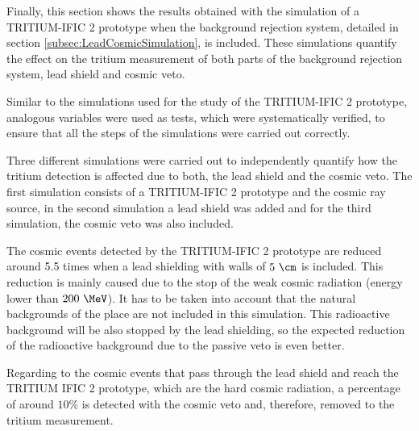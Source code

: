 Finally, this section shows the results obtained with the simulation of a TRITIUM-IFIC 2 prototype when the background rejection system, detailed in section \ref{subsec:LeadCosmicSimulation}, is included. These simulations quantify the effect on the tritium measurement of both parts of the background rejection system, lead shield and cosmic veto.

Similar to the simulations used for the study of the TRITIUM-IFIC 2 prototype, analogous variables were used as tests, which were systematically verified, to ensure that all the steps of the simulations were carried out correctly.

Three different simulations were carried out to independently quantify how the tritium detection is affected due to both, the lead shield and the cosmic veto. The first simulation consists of a TRITIUM-IFIC 2 prototype and the cosmic ray source, in the second simulation a lead shield was added and for the third simulation, the cosmic veto was also included.

The cosmic events detected by the TRITIUM-IFIC 2 prototype are reduced around 5.5 times when a lead shielding with walls of $5~\cm$ is included. This reduction is mainly caused due to the stop of the weak cosmic radiation (energy lower than $200~\MeV$). It has to be taken into account that the natural backgrounds of the place are not included in this simulation. This radioactive background will be also stopped by the lead shielding, so the expected reduction of the radioactive background due to the passive veto is even better.

Regarding to the cosmic events that pass through the lead shield and reach the TRITIUM IFIC 2 prototype, which are the hard cosmic radiation, a percentage of around $10\%$ is detected with the cosmic veto and, therefore, removed to the tritium measurement.